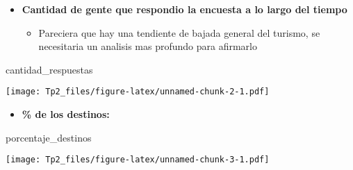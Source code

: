 \documentclass[
]{article}
\newenvironment{Shaded}{\begin{snugshade}}{\end{snugshade}}
\newcommand{\NormalTok}[1]{#1}
\providecommand{\tightlist}{%
  \setlength{\itemsep}{0pt}\setlength{\parskip}{0pt}}
\begin{document}
\begin{itemize}
\item
  \textbf{Cantidad de gente que respondio la encuesta a lo largo del
  tiempo}

  \begin{itemize}
  \tightlist
  \item
    Pareciera que hay una tendiente de bajada general del turismo, se
    necesitaria un analisis mas profundo para afirmarlo
  \end{itemize}
\end{itemize}

\begin{Shaded}
\begin{Highlighting}[]
\NormalTok{cantidad\_respuestas}
\end{Highlighting}
\end{Shaded}

\texttt{[image: Tp2\_files/figure-latex/unnamed-chunk-2-1.pdf]}

\begin{itemize}
\tightlist
\item
  \textbf{\% de los destinos:}
\end{itemize}

\begin{Shaded}
\begin{Highlighting}[]
\NormalTok{porcentaje\_destinos}
\end{Highlighting}
\end{Shaded}

\texttt{[image: Tp2\_files/figure-latex/unnamed-chunk-3-1.pdf]}
\end{document}
